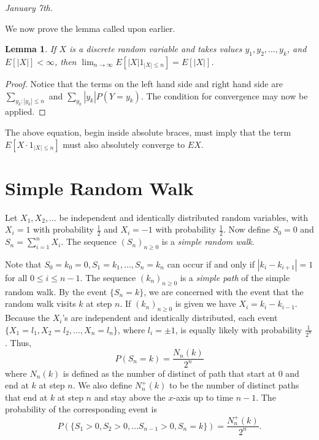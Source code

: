 \documentclass[15pt,a4paper]{book}
\newtheorem{lemma}[theorem]{Lemma}
\theoremstyle{definition}
\newcommand{\eax}[1]{\emph{#1}\index{#1}} %
\newcommand{\abs}[1]{\left| #1 \right|} %
\begin{document}
\textit{January 7th.}

We now prove the lemma called upon earlier.
\begin{lemma}
    If $X$ is a discrete random variable and takes values $y_{1},y_{2},\ldots,y_{k}$, and $E[\abs{X}] < \infty$, then $\lim_{n \to \infty} E[\abs{X}1_{\abs{X} \leq n}] = E[\abs{X}]$.
\end{lemma}
\begin{proof}
    Notice that the terms on the left hand side and right hand side are $\sum_{y_{k} : \abs{y_{k}} \leq n}$ and $\sum_{y_{k}} \abs{y_{k}} P(Y = y_{k})$. The condition for convergence may now be applied.
\end{proof}
The above equation, begin inside absolute braces, must imply that the term $E[X \cdot 1_{\abs{X} \leq n}]$ must also absolutely converge to $EX$.

\section{Simple Random Walk}
Let $X_{1},X_{2},\ldots$ be independent and identically distributed random variables, with $X_{i} = 1$ with probability $\frac{1}{2}$ and $X_{i}=-1$ with probability $\frac{1}{2}$. Now define $S_{0}=0$ and $S_{n} = \sum_{i=1}^{n} X_{i}$. The sequence $(S_{n})_{n \geq 0}$ is a \eax{simple random walk}.

Note that $S_{0}=k_{0}=0,S_{1}=k_{1},\ldots,S_{n}=k_{n}$ can occur if and only if $\abs{k_{i}-k_{i+1}} = 1$ for all $0 \leq i \leq n-1$. The sequence $(k_{n})_{n \geq 0}$ is a \eax{simple path} of the simple random walk. By the event $\{S_{n}=k\}$, we are concerned with the event that the random walk visits $k$ at step $n$. If $(k_{n})_{n \geq 0}$ is given we have $X_{i} = k_{i}-k_{i-1}$. Because the $X_{i}$'s are independent and identically distributed, each event $\{X_{1}=l_{1},X_{2}=l_{2},\ldots,X_{n}=l_{n}\}$, where $l_{i} = \pm 1$, is equally likely with probability $\frac{1}{2^{n}}$. Thus,
\begin{equation}
    P(S_{n}=k) = \frac{N_{n}(k)}{2^{n}}
\end{equation}
where $N_{n}(k)$ is defined as the number of distinct of path that start at $0$ and end at $k$ at step $n$. We also define $N_{n}^{+}(k)$ to be the number of distinct paths that end at $k$ at step $n$ and stay above the $x$-axis up to time $n-1$. The probability of the corresponding event is
\begin{equation}
    P(\{S_{1} > 0, S_{2} > 0, \ldots S_{n-1} > 0, S_{n} = k\}) = \frac{N_{n}^{+}(k)}{2^{n}}.
\end{equation}
\end{document}
